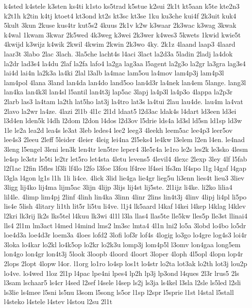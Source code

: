 {k4sted
k4stele
k3sten
ks4ti
k1sto
ks5trad
k5stue
k2sui
2k1t
kt5aan
k5te
kte2n3
k2t1h
k2tin
k4tj
ktoet4
kt3ond
kt2s
kt3sc
kt3se
1ku
ku3che
kui4f
2k3uit
kuk4
5kult
3kun
2kuse
kus4tr
kut5s2
4kuus
2k1v
k2w
k3waar
2k3wac
k3wag
3kwak
k4wal
1kwam
3kwar
2k5wed
4k3weg
k3wei
2k3wer
k4wes3
5kwets
1kwid
kwie5t
4kwijd
k3wijz
k4wik
2kwil
4kwim
2kwin
2k3wo
4ky.
2k1z
4laand
laap3
4laard
laar3t
3labo
2lac
3lach.
3la5che
lacht4s
l4aci
3lact
la2d3a
5ladin
2ladj
la4dok
la2dr
lad3s4
la4du
2laf
la2fa
lafo4
la2ga
lag3aa
l5agent
la2g3o
la2gr
la3gra
lag3s4
lai4d
lai4n
la2k3a
la4ki
2lal
l3alb
la4mac
lam5ou
la4mov
lam4p3j
lam4p3l
lam4pol
4lana
3land
lan4da
lan4do
land5oo
lan4d3r
la4nek
lan4em
5lange.
lang3l
lan4ka
lan4k3l
lan4sl
l5antil
lan4t3j
lap5ac
3lapj
la4p3l
la4p3o
4lappa
la2p3r
2larb
las3
la4tam
la2th
lat5ho
lat3j
la4tro
lat3s
la4tui
2lau
lau4de.
lau4m
la4vat
2lavo
la2wr
la4ze.
4lazi
2l1b
4l1c
2l1d
ldaat5
l2d3ac
ldak4s
l4dart
ld3een
ld3ei
l3d4en
lden5k
l4dh
l2dom
l2don
l4dos
l2d3ov
l5drie
lds4a
ld3sl
ld5sn
ld1sp
ld3w
1le
le2a
lea2d
lea4s
le3at
3leb
ledes4
lee2
leeg3
4leekh
leem5ac
lee4p3
leer5ov
lee4s3
2leeu
2leff
5leider
4leier
4leig
lei4na
2l5eks4
le4kw
l3elem
l2en
l4en.
le4nad
3leng
l5engel
3leni
len3k
len4tr
len5tre
leper4
3le5r4a
le1ro
le2s
les2k
le3sko
4lesm
le4sp
le3str
le5ti
le2tr
let5ro
let4sta
4letu
levens5
4levil4
4lexc
2lexp
3ley
4lf
l5fab
l2f1ac
l2fin
l5fles
lf3li
lf4lo
l2fo
l3foe
l3fou
lf4ree
lf4sei
lfs3m
lf4spo
l1g
l4gaf
l4gap
l3gla
l4gon
lg1s
l1h
1li
li4ce.
4lick
3lid
lie4ga
lie4gr
lieg5u
li3enn
lies4t
lieu3
3liev
3ligg
lij4ko
lij4ma
lijm5ac
3lijn
4lijp
3lijs
lij4st
lij5ste.
2l1ijz
li4ke.
li2ko
lilia4
lil4le.
4limp
lim4pj
2linf
4linh
lin4ka
3linn
4linr
2lins
lin4t3j
4linv
4lipj
li4pl
li5po
lis4e
5lish
4litary
li1th
lit5r
li5tu
li4ve.
l1j4
lk5aard
l4kaf
l4kei
l4kep
l4klag
l4klev
l2kri
lk3rij
lk2s
lks5tel
l4kuu
lk3wi
4l1l
l3la
llas4
llas5te
lle5kw
lles5p
lle3st
llinai4
lls4
2l1m
lm3act
l4med
l4mind
lms2
lm3sc
lmta4
4l1n
lni2
lo5a
3lobd
lo4bo
lo5dr
loe4d3a
loe4d3r
loem3a
4loes
lofd2
3lofi
lof3r
lof4s
4logig
lo3go
lo4gre
log4s3
loi4r
3loka
lo4kar
lo2kl
lo4k5op
lo2kr
lo2k3u
lomp3j
lom4p5l
l3omv
lon4gaa
long5em
lon4go
lon4gr
lon4t3j
5look
3loopb
4loord
4loort
3loper
4loph
4l5opl
4lopn
lop4r
2lops
2lopt
4lopw
l4or.
l1org
lo1ro
lo4sp
los1t
lo4str
lo2ta
lot3ak
lo2th
lot3j
lou2p
lo4ve.
lo4wed
1loz
2l1p
l4pac
lpe4ni
lpes4
lp2h
lp3j
lp3ond
l4ques
2l3r
lrus5
2ls
l3sam
lschaar5
ls4cr
l4sed
l2sef
l4sele
l4sep
ls2j
ls3ja
ls4kel
l3sla
l2sle
ls5led
l2sli
ls3lie
ls4mee
l5sni
ls5nu
l3som
l5song
ls5or
l1sp
l2spr
l5sprie
l1st
l4stal
l5stall
l4steko
l4stele
l4stev
l4stou
l2su
2l1t
}
